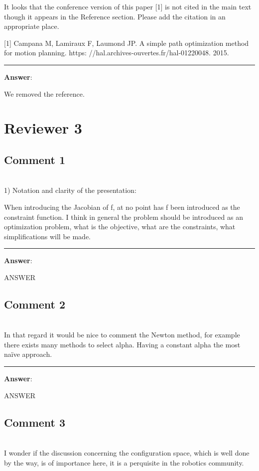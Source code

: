 \documentclass{scrartcl}
\begin{document}
It looks that the conference version of this paper [1] is not cited in the main text though it appears in the Reference section.  Please add the citation in an appropriate place.

[1] Campana M, Lamiraux F, Laumond JP. A simple path optimization method for motion planning. https:
//hal.archives-ouvertes.fr/hal-01220048. 2015.

\rule{\linewidth}{.1pt}
\textbf{Answer}:

We removed the reference.


\section{Reviewer 3}

\subsection{Comment 1}
\hrulefill\\

1) Notation and clarity of the presentation:

When introducing the Jacobian of f, at no point has f been introduced as the constraint function. I think in general the problem should be introduced as an optimization problem, what is the objective, what are the constraints, what simplifications will be made.

\rule{\linewidth}{.1pt}
\textbf{Answer}:

ANSWER

\subsection{Comment 2}
\hrulefill\\

In that regard it would be nice to comment the Newton method, for example there exists many methods to select alpha. Having a constant alpha the most naïve approach.

\rule{\linewidth}{.1pt}
\textbf{Answer}:

ANSWER

\subsection{Comment 3}
\hrulefill\\

I wonder if the discussion concerning the configuration space, which is well done by the way, is of importance here, it is a perquisite in the robotics community.
\end{document}
